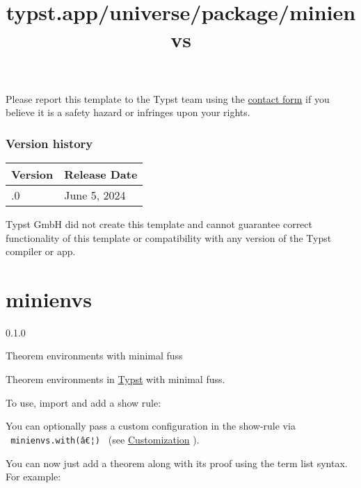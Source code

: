 Please report this template to the Typst team using the
\href{https://typst.app/contact}{contact form} if you believe it is a
safety hazard or infringes upon your rights.

\label{versions}
\subsubsection{Version history}\label{version-history}

\begin{longtable}[]{@{}ll@{}}
\toprule\noalign{}
Version & Release Date \\
\midrule\noalign{}
\endhead
\bottomrule\noalign{}
\endlastfoot
0.1.0 & June 5, 2024 \\
\end{longtable}

Typst GmbH did not create this template and cannot guarantee correct
functionality of this template or compatibility with any version of the
Typst compiler or app.


\title{typst.app/universe/package/minienvs}

\label{banner}
\section{minienvs}\label{minienvs}

{ 0.1.0 }

Theorem environments with minimal fuss

\label{readme}
Theorem environments in \href{https://typst.app/}{Typst} with minimal
fuss.

To use, import and add a show rule:

\begin{Shaded}
\begin{Highlighting}[]
\end{Highlighting}
\end{Shaded}

You can optionally pass a custom configuration in the show-rule via
\texttt{\ minienvs.with(â€¦)\ } (see
\href{https://github.com/typst/packages/raw/main/packages/preview/minienvs/0.1.0/\#customization}{Customization}
).

You can now just add a theorem along with its proof using the term list
syntax. For example:

